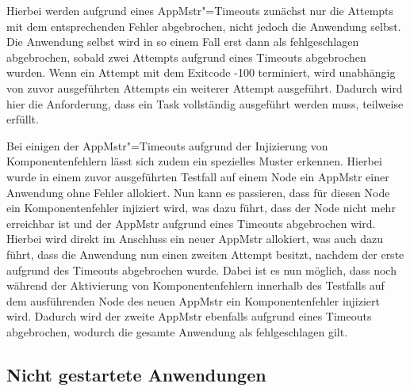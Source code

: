 Hierbei werden aufgrund eines \gls{AppMstr}"=Timeouts zunächst nur die Attempts mit dem entsprechenden Fehler abgebrochen, nicht jedoch die Anwendung selbst.
Die Anwendung selbst wird in so einem Fall erst dann als fehlgeschlagen abgebrochen, sobald zwei Attempts aufgrund eines Timeouts abgebrochen wurden.
Wenn ein Attempt mit dem Exitcode -100 terminiert, wird unabhängig von zuvor ausgeführten Attempts ein weiterer Attempt ausgeführt.
Dadurch wird hier die Anforderung, dass ein Task vollständig ausgeführt werden muss, teilweise erfüllt.

Bei einigen der \gls{AppMstr}"=Timeouts aufgrund der Injizierung von Komponentenfehlern lässt sich zudem ein spezielles Muster erkennen.
Hierbei wurde in einem zuvor ausgeführten Testfall auf einem Node ein \gls{AppMstr} einer Anwendung ohne Fehler allokiert.
Nun kann es passieren, dass für diesen Node ein Komponentenfehler injiziert wird, was dazu führt, dass der Node nicht mehr erreichbar ist und der \gls{AppMstr} aufgrund eines Timeouts abgebrochen wird.
Hierbei wird direkt im Anschluss ein neuer \gls{AppMstr} allokiert, was auch dazu führt, dass die Anwendung nun einen zweiten Attempt besitzt, nachdem der erste aufgrund des Timeouts abgebrochen wurde.
Dabei ist es nun möglich, dass noch während der Aktivierung von Komponentenfehlern innerhalb des Testfalls auf dem ausführenden Node des neuen \gls{AppMstr} ein Komponentenfehler injiziert wird.
Dadurch wird der zweite \gls{AppMstr} ebenfalls aufgrund eines Timeouts abgebrochen, wodurch die gesamte Anwendung als fehlgeschlagen gilt.

\subsection{Nicht gestartete Anwendungen}
\label{subsec:notStartedApps}

